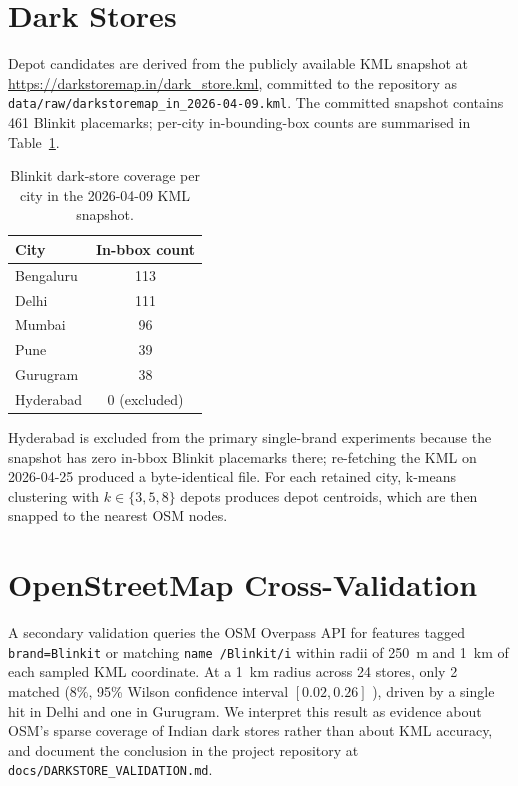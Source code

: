 \section{Dark Stores}

Depot candidates are derived from the publicly available KML snapshot
at \url{https://darkstoremap.in/dark_store.kml}, committed to the
repository as
\texttt{data/raw/darkstoremap\_in\_2026-04-09.kml}. The committed
snapshot contains 461 Blinkit placemarks; per-city in-bounding-box
counts are summarised in Table~\ref{tab:darkstore-counts}.

\begin{table}[ht]
\centering
\caption{Blinkit dark-store coverage per city in the 2026-04-09 KML
snapshot.}
\label{tab:darkstore-counts}
\begin{tabular}{lc}
\toprule
\textbf{City} & \textbf{In-bbox count} \\
\midrule
Bengaluru & 113 \\
Delhi     & 111 \\
Mumbai    &  96 \\
Pune      &  39 \\
Gurugram  &  38 \\
Hyderabad &   0 (excluded) \\
\bottomrule
\end{tabular}
\end{table}

Hyderabad is excluded from the primary single-brand experiments
because the snapshot has zero in-bbox Blinkit placemarks there;
re-fetching the KML on 2026-04-25 produced a byte-identical file. For
each retained city, k-means clustering with $k \in \{3, 5, 8\}$
depots produces depot centroids, which are then snapped to the
nearest OSM nodes.

\section{OpenStreetMap Cross-Validation}

A secondary validation queries the OSM Overpass API for features
tagged \texttt{brand=Blinkit} or matching \texttt{name~/Blinkit/i}
within radii of 250~m and 1~km of each sampled KML coordinate. At a
1~km radius across 24 stores, only 2 matched ($8\%$, 95\% Wilson
confidence interval $[0.02, 0.26]$ \citep{wilson1927}), driven by a
single hit in Delhi and one in Gurugram. We interpret this result as
evidence about OSM's sparse coverage of Indian dark stores rather
than about KML accuracy, and document the conclusion in the
project repository at \texttt{docs/DARKSTORE\_VALIDATION.md}.

